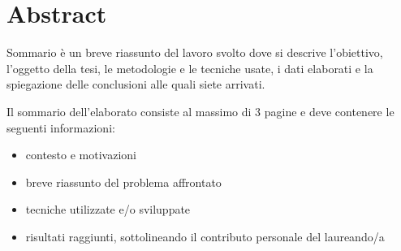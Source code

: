 \chapter*{Abstract} %
\label{abstract}


  Sommario è un breve riassunto del lavoro svolto dove si descrive l'obiettivo, l'oggetto della tesi, le 
metodologie e le tecniche usate, i dati elaborati e la spiegazione delle conclusioni alle quali siete arrivati.  

Il sommario dell’elaborato consiste al massimo di 3 pagine e deve contenere le seguenti informazioni:
\begin{itemize}
  \item contesto e motivazioni 
  \item breve riassunto del problema affrontato
  \item tecniche utilizzate e/o sviluppate
  \item risultati raggiunti, sottolineando il contributo personale del laureando/a
\end{itemize}




